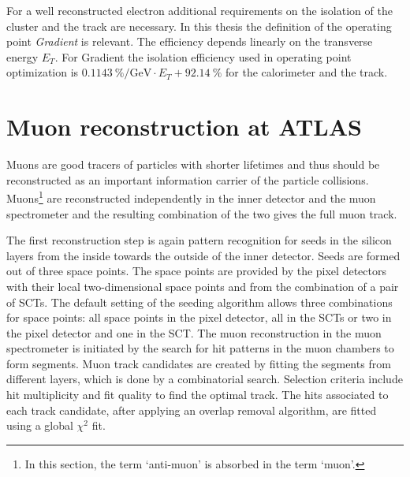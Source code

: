 For a well reconstructed electron additional requirements on the isolation of the cluster and the track are necessary. In this thesis the definition of the operating point \textit{Gradient} is relevant. The efficiency depends linearly on the transverse energy $E_T$. For Gradient the isolation efficiency used in operating point optimization is $\SI{0.1143}{\percent\per\giga\electronvolt}\cdot E_T+\SI{92.14}{\percent}$ for the calorimeter and the track. \cite{ePerformance}
%
%
\section{Muon reconstruction at ATLAS}\label{muReconstruction}
Muons are good tracers of particles with shorter lifetimes and thus should be reconstructed as an important information carrier of the particle collisions. Muons\footnote{In this section, the term `anti-muon' is absorbed in the term `muon'.} are reconstructed independently in the inner detector and the muon spectrometer and the resulting combination of the two gives the full muon track. \cite{muPerformance}\par
The first reconstruction step is again pattern recognition for seeds in the silicon layers from the inside towards the outside of the inner detector. Seeds are formed out of three space points. The space points are provided by the pixel detectors with their local two-dimensional space points and from the combination of a pair of SCTs. The default setting of the seeding algorithm allows three combinations for space points: all space points in the pixel detector, all in the SCTs or two in the pixel detector and one in the SCT. \cite{muInner}\newline
The muon reconstruction in the muon spectrometer is initiated by the search for hit patterns in the muon chambers to form segments. Muon track candidates are created by fitting the segments from different layers, which is done by a combinatorial search. Selection criteria include hit multiplicity and fit quality to find the optimal track. The hits associated to each track candidate, after applying an overlap removal algorithm, are fitted using a global $\chi^2$ fit. \cite{muPerformance}\newline
